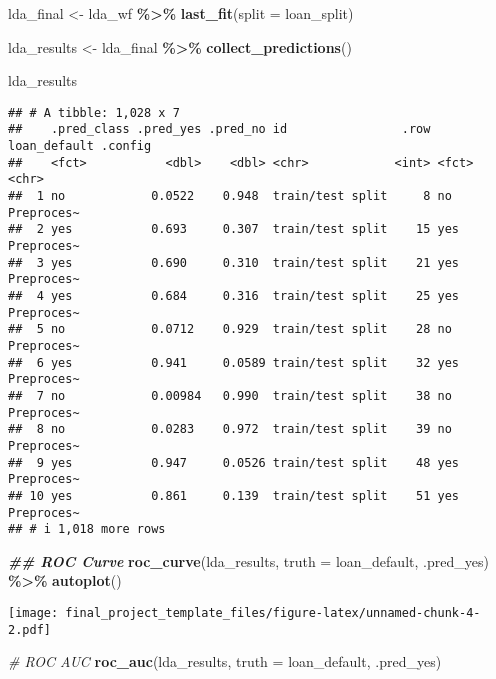 \documentclass[
]{article}
\newenvironment{Shaded}{\begin{snugshade}}{\end{snugshade}}
\newcommand{\AttributeTok}[1]{\textcolor[rgb]{0.13,0.29,0.53}{#1}}
\newcommand{\CommentTok}[1]{\textcolor[rgb]{0.56,0.35,0.01}{\textit{#1}}}
\newcommand{\DocumentationTok}[1]{\textcolor[rgb]{0.56,0.35,0.01}{\textbf{\textit{#1}}}}
\newcommand{\FunctionTok}[1]{\textcolor[rgb]{0.13,0.29,0.53}{\textbf{#1}}}
\newcommand{\NormalTok}[1]{#1}
\newcommand{\OtherTok}[1]{\textcolor[rgb]{0.56,0.35,0.01}{#1}}
\newcommand{\SpecialCharTok}[1]{\textcolor[rgb]{0.81,0.36,0.00}{\textbf{#1}}}
\begin{document}
\begin{Shaded}
\begin{Highlighting}[]
\NormalTok{lda\_final }\OtherTok{\textless{}{-}}\NormalTok{ lda\_wf }\SpecialCharTok{\%\textgreater{}\%}
  \FunctionTok{last\_fit}\NormalTok{(}\AttributeTok{split =}\NormalTok{ loan\_split)}

\NormalTok{lda\_results }\OtherTok{\textless{}{-}}\NormalTok{ lda\_final }\SpecialCharTok{\%\textgreater{}\%}
  \FunctionTok{collect\_predictions}\NormalTok{()}

\NormalTok{lda\_results}
\end{Highlighting}
\end{Shaded}

\begin{verbatim}
## # A tibble: 1,028 x 7
##    .pred_class .pred_yes .pred_no id                .row loan_default .config   
##    <fct>           <dbl>    <dbl> <chr>            <int> <fct>        <chr>     
##  1 no            0.0522    0.948  train/test split     8 no           Preproces~
##  2 yes           0.693     0.307  train/test split    15 yes          Preproces~
##  3 yes           0.690     0.310  train/test split    21 yes          Preproces~
##  4 yes           0.684     0.316  train/test split    25 yes          Preproces~
##  5 no            0.0712    0.929  train/test split    28 no           Preproces~
##  6 yes           0.941     0.0589 train/test split    32 yes          Preproces~
##  7 no            0.00984   0.990  train/test split    38 no           Preproces~
##  8 no            0.0283    0.972  train/test split    39 no           Preproces~
##  9 yes           0.947     0.0526 train/test split    48 yes          Preproces~
## 10 yes           0.861     0.139  train/test split    51 yes          Preproces~
## # i 1,018 more rows
\end{verbatim}

\begin{Shaded}
\begin{Highlighting}[]
\DocumentationTok{\#\# ROC Curve}
\FunctionTok{roc\_curve}\NormalTok{(lda\_results, }\AttributeTok{truth =}\NormalTok{ loan\_default, .pred\_yes) }\SpecialCharTok{\%\textgreater{}\%} 
  \FunctionTok{autoplot}\NormalTok{()}
\end{Highlighting}
\end{Shaded}

\texttt{[image: final\_project\_template\_files/figure-latex/unnamed-chunk-4-2.pdf]}

\begin{Shaded}
\begin{Highlighting}[]
\CommentTok{\# ROC AUC}
\FunctionTok{roc\_auc}\NormalTok{(lda\_results, }\AttributeTok{truth =}\NormalTok{ loan\_default, .pred\_yes)}
\end{Highlighting}
\end{Shaded}
\end{document}
